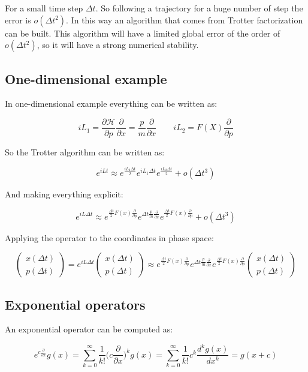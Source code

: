	For a small time step $\Delta t$.
	So following a trajectory for a huge number of step the error is $o(\Delta t^2)$.
	In this way an algorithm that comes from Trotter factorization can be built.
	This algorithm will have a limited global error of the order of $o(\Delta t^2)$, so it will have a strong numerical stability.

	\subsection{One-dimensional example}
	In one-dimensional example everything can be written as:

	$$iL_1 = \frac{\partial\mathcal{H}}{\partial p}\frac{\partial }{\partial x} = \frac{p}{m}\frac{\partial }{\partial x}\qquad iL_2 = F(X)\frac{\partial}{\partial p}$$

	So the Trotter algorithm can be written as:

	$$e^{iLt}\approx e^{\frac{iL_2\Delta t}{2}}e^{iL_1\Delta t}e^{\frac{iL_2\Delta t}{2}} + o(\Delta t^3)$$

	And making everything explicit:

	$$e^{iL\Delta t}\approx e^{\frac{\Delta t}{2}F(x)\frac{\partial}{\partial p}}e^{\Delta t\frac{p}{m}\frac{\partial}{\partial x}}e^{\frac{\Delta t}{2}F(x)\frac{\partial}{\partial p}} + o(\Delta t^3)$$

	Applying the operator to the coordinates in phase space:

	$$\begin{pmatrix}x(\Delta t)\\ p(\Delta t)\end{pmatrix}=e^{iL\Delta t}\begin{pmatrix}x(\Delta t)\\ p(\Delta t)\end{pmatrix}\approx e^{\frac{\Delta t}{2}F(x)\frac{\partial}{\partial p}}e^{\Delta t\frac{p}{m}\frac{\partial}{\partial x}}e^{\frac{\Delta t}{2}F(x)\frac{\partial}{\partial p}}\begin{pmatrix}x(\Delta t)\\ p(\Delta t)\end{pmatrix}$$

	\subsection{Exponential operators}
	An exponential operator can be computed as:

	$$e^{c\frac{\partial}{\partial x}}g(x) = \sum\limits_{k=0}^\infty\frac{1}{k!}\biggl(c\frac{\partial}{\partial x}\biggr)^kg(x) = \sum\limits_{k=0}^\infty\frac{1}{k!}c^k\frac{d^kg(x)}{dx^k} = g(x+c)$$

